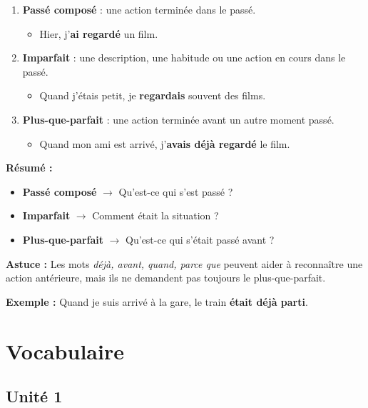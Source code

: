 \documentclass[math,code]{amznotes}
\theoremstyle{remark}
\begin{document}
\begin{enumerate}
    \item \textbf{Passé composé} : une action terminée dans le passé.
    \begin{itemize}
        \item Hier, j'\textbf{ai regardé} un film.
    \end{itemize}

    \item \textbf{Imparfait} : une description, une habitude ou une action en cours dans le passé.
    \begin{itemize}
        \item Quand j'étais petit, je \textbf{regardais} souvent des films.
    \end{itemize}

    \item \textbf{Plus-que-parfait} : une action terminée avant un autre moment passé.
    \begin{itemize}
        \item Quand mon ami est arrivé, j'\textbf{avais déjà regardé} le film.
    \end{itemize}
\end{enumerate}

\begin{notebox}
\textbf{Résumé :}

\begin{itemize}
    \item \textbf{Passé composé} $\rightarrow$ Qu'est-ce qui s'est passé ?
    \item \textbf{Imparfait} $\rightarrow$ Comment était la situation ?
    \item \textbf{Plus-que-parfait} $\rightarrow$ Qu'est-ce qui s'était passé avant ?
\end{itemize}

\textbf{Astuce :} Les mots \textit{déjà, avant, quand, parce que} peuvent aider à reconnaître une action antérieure, mais ils ne demandent pas toujours le plus-que-parfait.

\textbf{Exemple :} Quand je suis arrivé à la gare, le train \textbf{était déjà parti}.
\end{notebox}


\chapter{Vocabulaire} 

\section{Unité 1}
\end{document}
